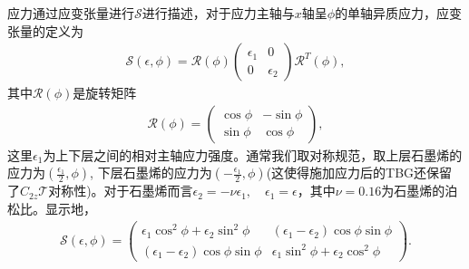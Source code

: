 \documentclass[10pt, oneside]{article}
\newcommand{\p}[1]{\left(#1\right)}
\begin{document}
应力通过应变张量进行\(\mathcal{S }\)进行描述，对于应力主轴与\(x \)轴呈\(\phi\)的单轴异质应力，应变张量的定义为
\begin{align}
	\mathcal{S } \left(\epsilon, \phi\right) = \mathcal{R } \left(\phi\right) \begin{pmatrix}
		\epsilon_1 & 0 \\ 0 &  \epsilon_2
	\end{pmatrix} \mathcal{R }^{T} \left(\phi\right),
\end{align}
其中\(\mathcal{R} \left(\phi\right)\)是旋转矩阵
\begin{align}
	\mathcal{R} \left(\phi\right) = \begin{pmatrix}
		\cos{\phi} & - \sin{\phi} \\ \sin{\phi} & \cos{\phi}
	\end{pmatrix},
\end{align}
这里\(\epsilon_{1}\)为上下层之间的相对主轴应力强度。通常我们取对称规范，取上层石墨烯的应力为\(\left(\frac{\epsilon_1}{2}, \phi\right)\), 下层石墨烯的应力为\(\left(-\frac{\epsilon_1}{2}, \phi \right)\)(这使得施加应力后的TBG还保留了\(C_{2z}\mathcal{T}\)对称性)。对于石墨烯而言\(\epsilon_2 = -\nu \epsilon_{1}, \quad \epsilon_{1} = \epsilon\)，其中\(\nu = 0.16\)为石墨烯的泊松比。显示地，
\begin{align}
	\mathcal{S } \left(\epsilon, \phi\right) = \begin{pmatrix}
		\epsilon_1 \cos^{2} \phi + \epsilon_2 \sin^2 \phi  & \p{\epsilon_1 - \epsilon_2} \cos \phi \sin \phi\\
		\p{\epsilon_1 - \epsilon_2} \cos \phi \sin \phi & \epsilon_1 \sin^2 \phi + \epsilon_2 \cos^2 \phi
	\end{pmatrix}.
\end{align}
\end{document}
